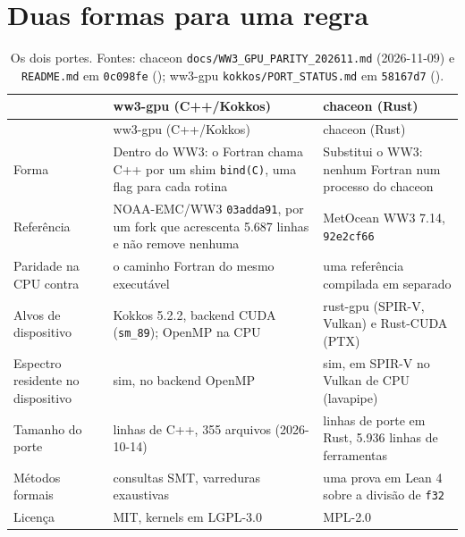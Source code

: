 \documentclass[10pt,a4paper,]{article}
\begin{document}
\section{Duas formas para uma regra}\label{sec:shapes}

\begin{longtable}[]{@{}
  >{\raggedright\arraybackslash}p{}
  >{\raggedright\arraybackslash}p{}
  >{\raggedright\arraybackslash}p{}@{}}
\caption{\label{tbl:shapes}Os dois portes. Fontes: chaceon
\texttt{docs/WW3\_GPU\_PARITY\_202611.md} (2026-11-09) e
\texttt{README.md} em \texttt{0c098fe} (); ww3-gpu \texttt{kokkos/PORT\_STATUS.md} em \texttt{58167d7}
().}\tabularnewline
\toprule\noalign{}
\begin{minipage}[b]{\linewidth}\raggedright
\end{minipage} & \begin{minipage}[b]{\linewidth}\raggedright
ww3-gpu (C++/Kokkos)
\end{minipage} & \begin{minipage}[b]{\linewidth}\raggedright
chaceon (Rust)
\end{minipage} \\
\midrule\noalign{}
\endfirsthead
\toprule\noalign{}
\begin{minipage}[b]{\linewidth}\raggedright
\end{minipage} & \begin{minipage}[b]{\linewidth}\raggedright
ww3-gpu (C++/Kokkos)
\end{minipage} & \begin{minipage}[b]{\linewidth}\raggedright
chaceon (Rust)
\end{minipage} \\
\midrule\noalign{}
\endhead
\bottomrule\noalign{}
\endlastfoot
Forma & Dentro do WW3: o Fortran chama C++ por um shim \texttt{bind(C)},
uma flag para cada rotina & Substitui o WW3: nenhum Fortran num processo
do chaceon \\
Referência & NOAA-EMC/WW3 \texttt{03adda91}, por um fork que acrescenta
5.687 linhas e não remove nenhuma & MetOcean WW3 7.14,
\texttt{92e2cf66} \\
Paridade na CPU contra & o caminho Fortran do mesmo executável & uma
referência compilada em separado \\
Alvos de dispositivo & Kokkos 5.2.2, backend CUDA (\texttt{sm\_89});
OpenMP na CPU & rust-gpu (SPIR-V, Vulkan) e Rust-CUDA (PTX) \\
Espectro residente no dispositivo & sim, no backend OpenMP & sim, em
SPIR-V no Vulkan de CPU (lavapipe) \\
Tamanho do porte & 62.257 linhas de C++, 355 arquivos (2026-10-14) &
29.229 linhas de porte em Rust, 5.936 linhas de ferramentas \\
Métodos formais & consultas SMT, varreduras exaustivas & uma prova em
Lean 4 sobre a divisão de \texttt{f32} \\
Licença & MIT, kernels em LGPL-3.0 & MPL-2.0 \\
\end{longtable}
\end{document}
